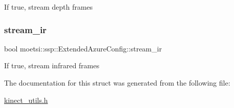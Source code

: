 If true, stream depth frames \mbox{\label{structmoetsi_1_1ssp_1_1ExtendedAzureConfig_ab4c4fd8a25fe1a5c97aace78bc6d987c}} 
\subsubsection{\texorpdfstring{stream\+\_\+ir}{stream\_ir}}
{\footnotesize\ttfamily bool moetsi\+::ssp\+::\+Extended\+Azure\+Config\+::stream\+\_\+ir}

If true, stream infrared frames 

The documentation for this struct was generated from the following file\+:\begin{DoxyCompactItemize}
\item 
\hyperlink{kinect__utils_8h}{kinect\+\_\+utils.\+h}\end{DoxyCompactItemize}
